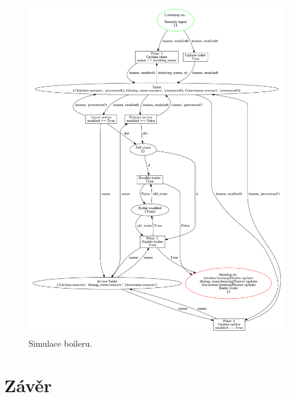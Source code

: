 \begin{figure}[httb]
  \centering
  \includegraphics[width=\textwidth]{obrazky-figures/boiler-logic.png}
  \caption{Simulace boileru.}
  \label{boiler-logic-viz}
\end{figure}

\chapter{Závěr}
\label{zaver}
